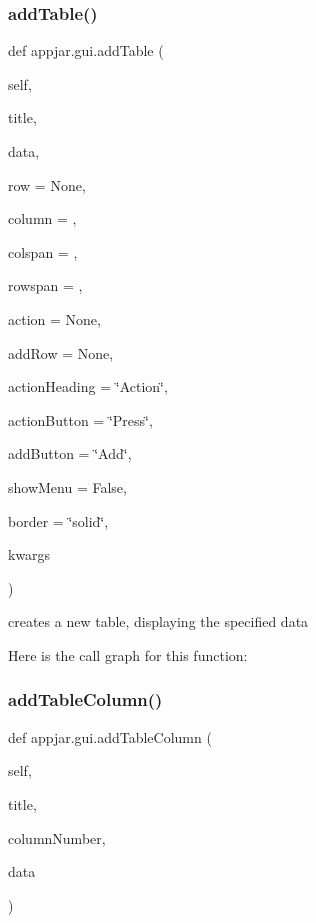 \subsubsection{\texorpdfstring{add\+Table()}{addTable()}}
{\footnotesize\ttfamily def appjar.\+gui.\+add\+Table (\begin{DoxyParamCaption}\item[{}]{self,  }\item[{}]{title,  }\item[{}]{data,  }\item[{}]{row = {\ttfamily None},  }\item[{}]{column = {},  }\item[{}]{colspan = {},  }\item[{}]{rowspan = {},  }\item[{}]{action = {\ttfamily None},  }\item[{}]{add\+Row = {\ttfamily None},  }\item[{}]{action\+Heading = {\ttfamily \char`\"{}Action\char`\"{}},  }\item[{}]{action\+Button = {\ttfamily \char`\"{}Press\char`\"{}},  }\item[{}]{add\+Button = {\ttfamily \char`\"{}Add\char`\"{}},  }\item[{}]{show\+Menu = {\ttfamily False},  }\item[{}]{border = {\ttfamily \char`\"{}solid\char`\"{}},  }\item[{}]{kwargs }\end{DoxyParamCaption})}

\begin{DoxyVerb}creates a new table, displaying the specified data \end{DoxyVerb}
 Here is the call graph for this function\+:
\mbox{\label{classappjar_1_1gui_a353ba921573317a1049091a364e4a345}} 
\subsubsection{\texorpdfstring{add\+Table\+Column()}{addTableColumn()}}
{\footnotesize\ttfamily def appjar.\+gui.\+add\+Table\+Column (\begin{DoxyParamCaption}\item[{}]{self,  }\item[{}]{title,  }\item[{}]{column\+Number,  }\item[{}]{data }\end{DoxyParamCaption})}

